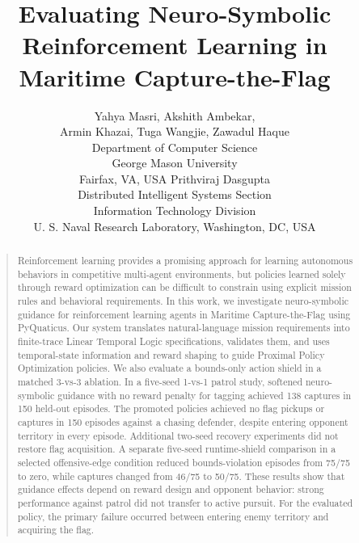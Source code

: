 \documentclass[letterpaper]{article}
\begin{document}
\title{Evaluating Neuro-Symbolic Reinforcement Learning in Maritime Capture-the-Flag}

\author{Yahya Masri, Akshith Ambekar, \\
Armin Khazai, Tuga Wangjie, Zawadul Haque\\
Department of Computer Science\\
George Mason University\\
Fairfax, VA, USA
\And Prithviraj Dasgupta\\
Distributed Intelligent Systems Section\\
Information Technology Division\\
U. S. Naval Research Laboratory, Washington, DC, USA
}

\maketitle

\begin{abstract}
\begin{quote}
Reinforcement learning provides a promising approach for learning autonomous behaviors in competitive multi-agent environments, but policies learned solely through reward optimization can be difficult to constrain using explicit mission rules and behavioral requirements. In this work, we investigate neuro-symbolic guidance for reinforcement learning agents in Maritime Capture-the-Flag using PyQuaticus. Our system translates natural-language mission requirements into finite-trace Linear Temporal Logic specifications, validates them, and uses temporal-state information and reward shaping to guide Proximal Policy Optimization policies. We also evaluate a bounds-only action shield in a matched 3-vs-3 ablation. In a five-seed 1-vs-1 patrol study, softened neuro-symbolic guidance with no reward penalty for tagging achieved 138 captures in 150 held-out episodes. The promoted policies achieved no flag pickups or captures in 150 episodes against a chasing defender, despite entering opponent territory in every episode. Additional two-seed recovery experiments did not restore flag acquisition. A separate five-seed runtime-shield comparison in a selected offensive-edge condition reduced bounds-violation episodes from 75/75 to zero, while captures changed from 46/75 to 50/75. These results show that guidance effects depend on reward design and opponent behavior: strong performance against patrol did not transfer to active pursuit. For the evaluated policy, the primary failure occurred between entering enemy territory and acquiring the flag.
\end{quote}
\end{abstract}
\end{document}
